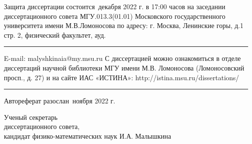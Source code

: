 \vfill


Защита диссертации состоится  \guillemotright\,декабря 2022 г. в 17:00 часов на заседании диссертационного совета МГУ.013.3(01.01) Московского государственного университета имени М.В.Ломоносова по адресу: г. Москва, Ленинские горы, д.1 стр. 2, физический факультет, ауд.\rule{5mm}{0.15mm}
\bigbreak
E-mail: malyshkinaia@my.msu.ru
\bigbreak
С диссертацией можно ознакомиться в отделе диссертаций научной библиотеки МГУ имени М.В. Ломоносова (Ломоносовский просп., д. 27) и на сайте ИАС «ИСТИНА»: http://istina.msu.ru/dissertations/\rule{20mm}{0.15mm}
Автореферат разослан 
\guillemotright\,ноября 2022 г.

\bigbreak

{\parindent0pt Ученый секретарь \\
диссертационного совета, \\
кандидат физико-математических наук \hfill	И.А. Малышкина}

\thispagestyle{empty}
\newpage